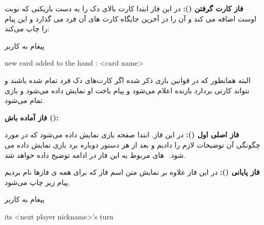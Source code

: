\documentclass[]{article}
\begin{document}
\vspace{.5cm}
\textbf{فاز کارت گرفتن ():}
در این فاز ابتدا کارت بالای دک را به دست بازیکنی که نوبت اوست اضافه می کند و 
آن را در آخرین جایگاه کارت های آن فرد می گذارد و این پیام را چاپ می‌کند:
\begin{mybox}[colback=yellow]{پیغام به کاربر}
	\begin{latin}	
		new card added to the hand : <card name>
	\end{latin}
\end{mybox}
البته همانطور که در قوانین بازی ذکر شده اگر کارت‌های دک فرد تمام شده باشند و 
نتواند کارتی بردارد بازنده اعلام می‌شود و پیام باخت او نمایش داده می‌شود و 
بازی تمام می‌شود.

\vspace{.5cm}
\textbf{فاز آماده باش ():}

\vspace{.5cm}
\textbf{فاز اصلی اول ():}
در این فاز. ابتدا صفحه بازی نمایش داده می‌شود که در مورد چگونگی آن توضیحات 
لازم را دادیم و بعد از هر دستور دوباره برد بازی نمایش داده می شود. 
‌ های مربوط به این فاز در ادامه توضیح داده خواهد شد.

\vspace{.5cm}
\textbf{فاز پایانی ():}
    در این فاز علاوه بر نمایش متن اسم فاز که برای همه ی فازها نام بردیم پیام 
    زیر چاپ می‌شود. 
\begin{mybox}[colback=yellow]{پیغام به کاربر}
	\begin{latin}	
	    its <next player nickname>’s turn
	\end{latin}
\end{mybox}
\end{document}
